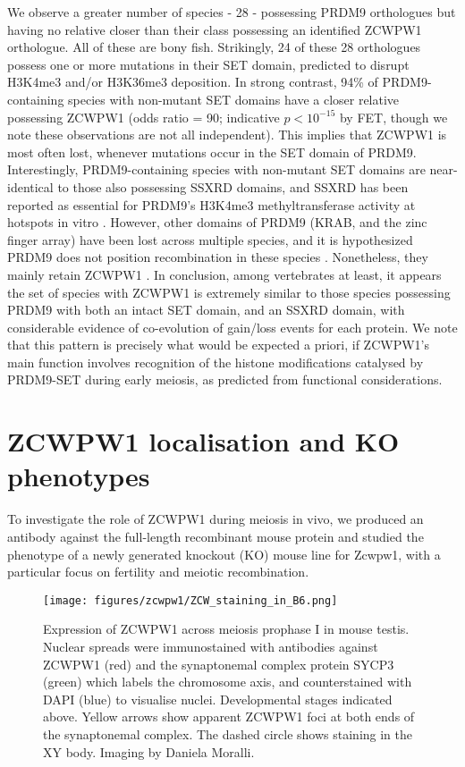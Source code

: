 We observe a greater number of species - 28 - possessing PRDM9 orthologues but having no relative closer than their class possessing an identified ZCWPW1 orthologue.
All of these are bony fish.
Strikingly, 24 of these 28 orthologues possess one or more mutations in their SET domain\iffalse supp table \fi, predicted to disrupt H3K4me3 and/or H3K36me3 deposition.
In strong contrast, 94\% of PRDM9-containing species with non-mutant SET domains have a closer relative possessing ZCWPW1 (odds ratio = 90; indicative $p < 10^{-15}$ by FET, though we note these observations are not all independent).
This implies that ZCWPW1 is most often lost, whenever mutations occur in the SET domain of PRDM9.
Interestingly, PRDM9-containing species with non-mutant SET domains are near-identical to those also possessing SSXRD domains, and SSXRD has been reported as essential for PRDM9’s H3K4me3 methyltransferase activity at hotspots in vitro \parencite{Thibault-Sennett2018Interrogating}.
However, other domains of PRDM9 (KRAB, and the zinc finger array) have been lost across multiple species, and it is hypothesized PRDM9 does not position recombination in these species \parencite{Baker2017Repeated}.
Nonetheless, they mainly retain ZCWPW1 \iffalse supp table \fi.
In conclusion, among vertebrates at least, it appears the set of species with ZCWPW1 is extremely similar to those species possessing PRDM9 with both an intact SET domain, and an SSXRD domain, with considerable evidence of co-evolution of gain/loss events for each protein.
We note that this pattern is precisely what would be expected a priori, if ZCWPW1’s main function involves recognition of the histone modifications catalysed by PRDM9-SET during early meiosis, as predicted from functional considerations.

\section{ZCWPW1 localisation and  KO phenotypes} %
To investigate the role of ZCWPW1 during meiosis in vivo, we produced an antibody against the full-length recombinant mouse protein \iffalse supp fig 2 \fi and studied the phenotype of a newly generated knockout (KO) mouse line for Zcwpw1, with a particular focus on fertility and meiotic recombination.

\begin{figure}[H]
	\centering
	\texttt{[image: figures/zcwpw1/ZCW\_staining\_in\_B6.png]}
	\caption[Zcwpw1 Expression]{
		Expression of ZCWPW1 across meiosis prophase I in mouse testis.
		Nuclear spreads were immunostained with antibodies against ZCWPW1 (red) and the synaptonemal complex protein SYCP3 (green) which labels the chromosome axis, and counterstained with DAPI (blue) to visualise nuclei.
		Developmental stages indicated above.
		Yellow arrows show apparent ZCWPW1 foci at both ends of the synaptonemal complex.
		The dashed circle shows staining in the XY body.
		Imaging by Daniela Moralli.
	}
	\label{fig:ZCWPW1_expression}
\end{figure}

